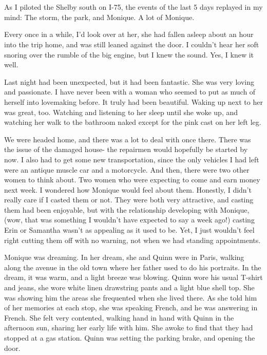 \chapter{}
As I piloted the Shelby south on I-75, the events of the last 5 days replayed in my mind:
The storm, the park, and Monique. A lot of Monique.

Every once in a while, I'd look over at her, she had fallen asleep about an hour into the
trip home, and was still leaned against the door. I couldn't hear her soft snoring over the
rumble of the big engine, but I knew the sound. Yes, I knew it well.

Last night had been unexpected, but it had been fantastic. She was very loving and
passionate. I have never been with a woman who seemed to put as much of herself into lovemaking
before. It truly had been beautiful. Waking up next to her was great, too. Watching and
listening to her sleep until she woke up, and watching her walk to the bathroom naked except for
the pink cast on her left leg.

We were headed home, and there was a lot to deal with once there. There was the issue of
the damaged house- the repairmen would hopefully be started by now. I also had to get some new
transportation, since the only vehicles I had left were an antique muscle car and a motorcycle.
And then, there were two other women to think about. Two women who were expecting to come and
earn money next week. I wondered how Monique would feel about them. Honestly, I didn't really
care if I casted them or not. They were both very attractive, and casting them had been
enjoyable, but with the relationship developing with Monique, (wow, that was something I
wouldn't have expected to say a week ago!) casting Erin or Samantha wasn't as appealing as it
used to be. Yet, I just wouldn't feel right cutting them off with no warning, not when we had
standing appointments.

\begin{thought}
Monique was dreaming. In her dream, she and Quinn were in Paris, walking along the avenue
in the old town where her father used to do his portraits. In the dream, it was warm, and a
light breeze was blowing. Quinn wore his usual T-shirt and jeans, she wore white linen
drawstring pants and a light blue shell top. She was showing him the areas she frequented when
she lived there. As she told him of her memories at each stop, she was speaking French, and he
was answering in French. She felt very contented, walking hand in hand with Quinn in the
afternoon sun, sharing her early life with him. She awoke to find that they had stopped at a gas
station. Quinn was setting the parking brake, and opening the door.
\end{thought}

